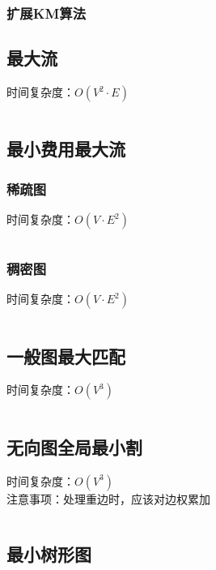 \documentclass[a4paper]{article}
\newcommand{\cppcode}[1]{
    \inputminted[mathescape]{cpp}{source/#1}
}
\begin{document}
\cppcode{graph-theory/maximum-weight-matching.cpp}

\subsubsection{扩展KM算法}

\subsection{最大流}

时间复杂度：$O(V^2 \cdot E)$

\cppcode{graph-theory/maximum-flow.cpp}

\subsection{最小费用最大流}

\subsubsection{稀疏图}

时间复杂度：$O(V \cdot E^2)$

\cppcode{graph-theory/minimum-cost-flow-spfa.cpp}

\subsubsection{稠密图}

时间复杂度：$O(V \cdot E^2)$

\cppcode{graph-theory/minimum-cost-flow-zkw.cpp}

\subsection{一般图最大匹配}

时间复杂度：$O(V^3)$

\cppcode{graph-theory/maximum-matching-blossom.cpp}

\subsection{无向图全局最小割}

时间复杂度：$O(V^3)$\\
\indent 注意事项：处理重边时，应该对边权累加

\cppcode{graph-theory/minimum-cut-stoer-wagner.cpp}

\subsection{最小树形图}
\end{document}
